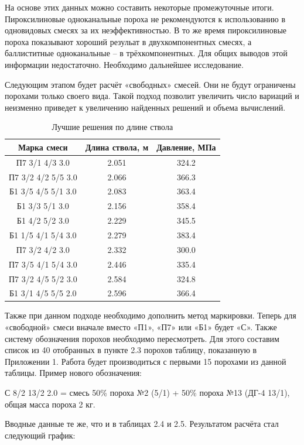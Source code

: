 \documentclass[14pt, a4paper]{extreport} %
\begin{document}
На основе этих данных можно составить некоторые промежуточные итоги. Пироксилиновые одноканальные пороха не рекомендуются к использованию в одновидовых смесях за их неэффективностью. В то же время пироксилиновые пороха показывают хороший резульат в двухкомпонентных смесях, а баллиститные одноканальные -- в трёхкомпонентных. Для общих выводов этой информации недостаточно. Необходимо дальнейшее исследование.

Следующим этапом будет расчёт «свободных» смесей. Они не будут ограничены порохами только своего вида. Такой подход позволит увеличить число вариаций и неизменно приведет к увеличению найденных решений и объема вычислений.


\begin{table}[H]
\centering
\caption{Лучшие решения по длине ствола}
\begin{tabular}{|c|c|c|}
\hline
\textbf{Марка смеси} & \textbf{Длина ствола, м} & \textbf{Давление, МПа} \\
\hline
П7 3/1 4/3 3.0 & 2.051 & 324.2 \\
\hline
П7 3/2 4/2 5/5 3.0 & 2.066 & 366.3 \\
\hline
Б1 3/5 4/5 5/1 3.0 & 2.083 & 363.4 \\
\hline
Б1 3/3 5/1 3.0 & 2.156 & 358.4 \\
\hline
Б1 4/2 5/2 3.0 & 2.229 & 345.5 \\
\hline
Б1 1/5 4/1 5/4 3.0 & 2.279 & 383.4 \\
\hline
П7 3/2 4/2 3.0 & 2.332 & 300.0 \\
\hline
П7 3/5 4/1 5/4 3.0 & 2.446 & 335.4 \\
\hline
П7 3/2 4/5 5/2 3.0 & 2.584 & 324.8 \\
\hline
Б1 3/1 4/5 5/5 2.0 & 2.596 & 366.4 \\
\hline
\end{tabular}
\end{table}

Также при данном подходе необходимо дополнить метод маркировки. Теперь для «свободной» смеси вначале вместо «П1», «П7» или «Б1» будет «С». Также систему обозначения порохов необходимо пересмотреть. Для этого составим список из 40 отобранных в пункте 2.3 порохов таблицу, показанную в Приложении 1. Работа будет производиться с первыми 15 порохами из данной таблицы. Пример нового обозначения: 

С 8/2 13/2 2.0 = смесь 50\% пороха №2 (5/1) + 50\% пороха №13 (ДГ-4 13/1), общая масса пороха 2 кг.

Вводные данные те же, что и в таблицах 2.4 и 2.5. Результатом расчёта стал следующий график: 
\end{document}
